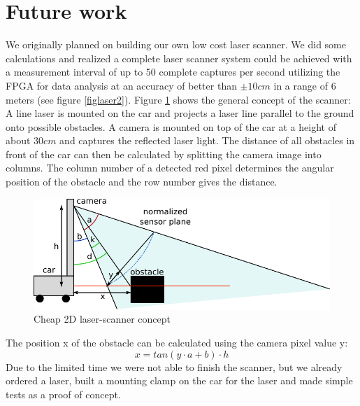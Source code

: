 \documentclass[a4paper
               ,10pt
               ,DIV=10 %
               ,BCOR=0.3cm
               ,pagesize %
               ,headings=small
               ,bibtotoc
               ]
               {scrartcl}
\begin{document}
\section{Future work}
We originally planned on building our own low cost laser scanner. We did some calculations and realized a complete laser scanner system could be achieved with a measurement interval of up to 50 complete captures per second utilizing the FPGA for data analysis at an accuracy of better than $\pm10cm$ in a range of 6 meters (see figure \ref{figlaser2}). Figure \ref{figlaser} shows the general concept of the scanner: A line laser  is mounted on the car and projects a laser line parallel to the ground onto possible obstacles. A camera is mounted on top of the car at a height of about $30cm$ and captures the reflected laser light. The distance of all obstacles in front of the car can then be calculated by splitting the camera image into columns. The column number of a detected red pixel determines the angular position of the obstacle and the row number gives the distance.
\begin{figure}[H]
\begin{center}
\includegraphics[width=0.8\linewidth]{pic/laser}
\caption{Cheap 2D laser-scanner concept}
\label{figlaser}
\end{center}
\end{figure}
The position x of the obstacle can be calculated using the camera pixel value y:
$$x = tan(y\cdot a+b)\cdot h$$
Due to the limited time we were not able to finish the scanner, but we already ordered a laser, built a mounting clamp on the car for the laser and made simple tests as a proof of concept.
\end{document}
